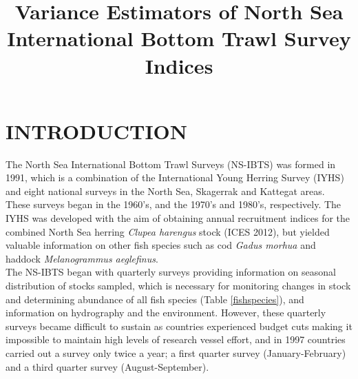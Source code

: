 \documentclass[a4paper 12pt]{article}
\title{\bf 
}
\author{}
\date{}
\numberwithin{equation}{section}
\begin{document}
\title{Variance Estimators of North Sea International Bottom Trawl Survey Indices}

\maketitle


\begin{abstract}

\end{abstract}

\clearpage
\section{\large INTRODUCTION}
The North Sea International Bottom Trawl Surveys (NS-IBTS) was formed in 1991, which is a combination of the International Young Herring Survey (IYHS) and eight national surveys in the North Sea, Skagerrak and Kattegat areas. These surveys began in the 1960's, and the 1970's and 1980's, respectively. The IYHS was developed with the aim of obtaining annual recruitment indices for the combined North Sea herring \emph{Clupea harengus} stock (ICES 2012), but yielded valuable information on other fish species such as cod \emph{Gadus morhua} and haddock \emph{ Melanogrammus aeglefinus}.\\
\indent The NS-IBTS began with quarterly surveys providing information on seasonal distribution of stocks sampled, which is necessary for monitoring changes in stock and determining abundance of all fish species (Table \ref{fishspecies}), and information on hydrography and the environment. However, these quarterly surveys became difficult to sustain as countries experienced budget cuts making it impossible to maintain high levels of research vessel effort, and in 1997 countries carried out a survey only twice a year; a first quarter survey (January-February) and a third quarter survey (August-September).\\



\end{document}
